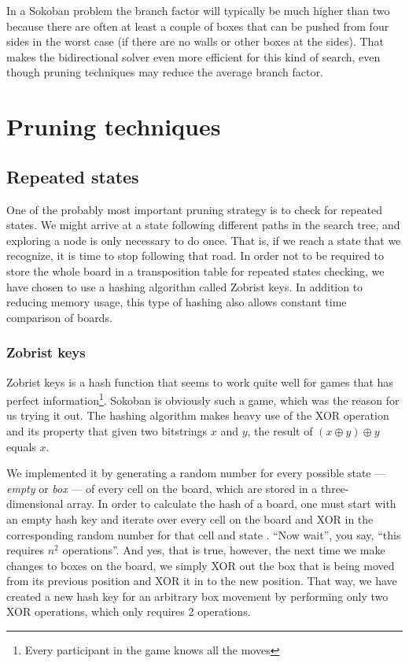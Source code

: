 \documentclass[a4paper,11pt]{article}
\renewcommand{\*}[0]{\cdot}
\begin{document}
In a Sokoban problem the branch factor will typically be much higher than two
because there are often at least a couple of boxes that can be pushed from four
sides in the worst case (if there are no walls or other boxes at the sides).
That makes the bidirectional solver even more efficient for this kind of
search, even though pruning techniques may reduce the average branch factor.



\section{Pruning techniques}

\subsection{Repeated states}

One of the probably most important pruning strategy is to check for repeated
states. We might arrive at a state following different paths in the search tree,
and exploring a node is only necessary to do once. That is, if we reach a state
that we recognize, it is time to stop following that road. In order not to be
required to store the whole board in a transposition table for repeated states
checking, we have chosen to use a hashing algorithm called Zobrist keys. In
addition to reducing memory usage, this type of hashing also allows constant
time comparison of boards.


\subsubsection{Zobrist keys}

Zobrist keys is a hash function that seems to work quite well for games that has
perfect information\footnote{Every participant in the game knows all the moves}.
Sokoban is obviously such a game, which was the reason for us trying it out. The
hashing algorithm makes heavy use of the XOR operation and its property that
given two bitstrings $x$ and $y$, the result of $(x \oplus y) \oplus y$ equals
$x$.

We implemented it by generating a random number for every possible state ---
\emph{empty} or \emph{box} --- of every cell on the board, which are stored in a
three-dimensional array. In order to calculate the hash of a board, one must
start with an empty hash key and iterate over every cell on the board and
XOR in the corresponding random number for that cell and state . ``Now wait'',
you say, ``this requires $n^2$ operations''. And yes, that is true, however, the
next time we make changes to boxes on the board, we simply XOR out the box that
is being moved from its previous position and XOR it in to the new position.
That way, we have created a new hash key for an arbitrary box movement by
performing only two XOR operations, which only requires 2 operations.
\end{document}
